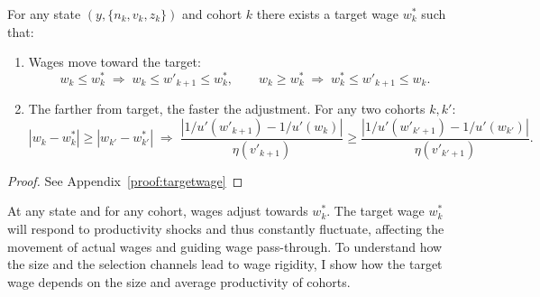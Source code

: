 \begin{proposition}\label{prop:targetwage}
For any state $(y,\{n_k,v_k,z_k\})$ and cohort $k$ there exists a target wage $w^*_k$ such that:
\begin{enumerate}
\item Wages move toward the target: \\
\[
w_k \le w_k^* \;\Rightarrow\; w_k \le w'_{k+1} \le w_k^*,
\qquad
w_k \ge w_k^* \;\Rightarrow\; w_k^* \le w'_{k+1} \le w_k.
\]
\item The farther from target, the faster the adjustment. For any two cohorts $k,k'$: \\
\[
|w_k-w_k^*|\ge |w_{k'}-w_{k'}^*|
\;\Rightarrow\;
\frac{|1/u'(w'_{k+1})-1/u'(w_k)|}{\eta(v'_{k+1})}\ge \frac{|1/u'(w'_{k'+1})-1/u'(w_{k'})|}{\eta(v'_{k'+1})}.
\]

\end{enumerate}
\end{proposition}
\begin{proof}
    See Appendix~\ref{proof:targetwage}
\end{proof}

At any state and for any cohort, wages adjust towards $w^*_k$. The target wage $w^*_k$ will respond to productivity shocks and thus constantly fluctuate, affecting the movement of actual wages and guiding wage pass-through. 
To understand how the size and the selection channels lead to wage rigidity, I show how the target wage depends on the size and average productivity of cohorts.

